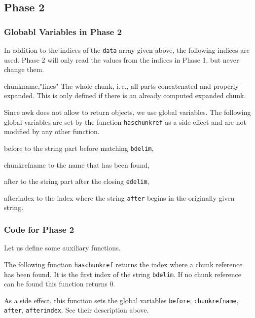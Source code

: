 \documentclass[a4paper]{article} %
\newcommand{\packagename}[1]{{\normalfont\sffamily#1}}
\newcommand{\ie}{i.\,e.}
\newenvironment{ttdescription}
  {\list{}{\labelwidth0pt \itemindent-\leftmargin
      \def\makelabel##1{\hspace\labelsep
        \normalfont\ttfamily ##1:}}}
  {\endlist}
\begin{document}
\subsection{Phase 2}\label{sec:phase2}
\subsubsection{Globabl Variables in Phase 2}

In addition to the indices of the \texttt{data} array given above, the
following indices are used.
%
Phase 2 will only read the values from the indices in Phase 1, but
never change them.
\begin{ttdescription}
\item[chunkname,"lines"] The whole chunk, \ie, all parts concatenated
  and properly expanded. This is only defined if there is an already
  computed expanded chunk.
\end{ttdescription}

Since \packagename{awk} does not allow to return objects, we use
global variables. The following global variables are set by the
function \texttt{haschunkref} as a side effect and are not modified by
any other function.
\begin{ttdescription}
\item[before] to the string part before matching \texttt{bdelim},
\item[chunkrefname] to the name that has been found,
\item[after] to the string part after the closing \texttt{edelim},
\item[afterindex] to the index where the string \texttt{after} begins
  in the originally given string.
\end{ttdescription}


\subsubsection{Code for Phase 2}

Let us define some auxiliary functions.

The following function \texttt{haschunkref} returns the index where a
chunk reference has been found. It is the first index of the string
\texttt{bdelim}. If no chunk reference can be found this function
returns 0.

As a side effect, this function sets the global variables
\texttt{before}, \texttt{chunkrefname}, \texttt{after},
\texttt{afterindex}. See their description above.
\end{document}
